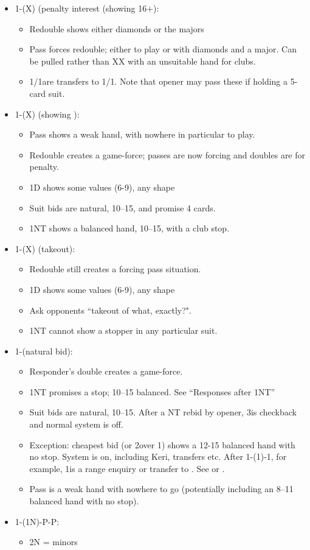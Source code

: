 \documentclass[a4paper,14pt]{extarticle}
\begin{document}
\begin{itemize}
\item 1\clubs-(X) (penalty interest (showing 16+):
	\begin{itemize}
   \item Redouble shows either diamonds or the majors
   \item Pass forces redouble; either to play or with diamonds and a major. Can be pulled rather than XX with an unsuitable hand for clubs.
   \item 1\diamonds/1\hearts are transfers to 1\hearts/1\spades.  Note that opener may pass these if holding a 5-card 
      suit.
	\end{itemize}
\item 1\clubs-(X) (showing \clubs):
	\begin{itemize}
   \item Pass shows a weak hand, with nowhere in particular to play.
   \item Redouble creates a game-force; passes are now forcing and doubles are for penalty.
	\item 1D shows some values (6-9), any shape
   \item Suit bids are natural, 10--15, and promise 4 cards.
   \item 1NT shows a balanced hand, 10--15, with a club stop.
	\end{itemize}
\item 1\clubs-(X) (takeout):
	\begin{itemize}
   \item Redouble still creates a forcing pass situation.
	\item 1D shows some values (6-9), any shape
   \item Ask opponents ``takeout of what, exactly?".
   \item 1NT cannot show a stopper in any particular suit.
	\end{itemize}
\item 1\clubs-(natural bid):
	\begin{itemize}
   \item Responder's double creates a game-force.
   \item 1NT promises a stop; 10--15 balanced. See ``Responses after 1NT'' 
   \item Suit bids are natural, 10--15. After a NT rebid by opener, 3\clubs is checkback and normal system is off. 
   \item Exception: cheapest bid (or 2\spades over 1\spades) shows a 12-15 balanced hand with no stop.  System is on, including Keri, transfers etc.  After 1\clubs-(1\diamonds)-1\hearts, for example, 1\spades is a range enquiry or transfer to \clubs. See  or .
   \item Pass is a weak hand with nowhere to go (potentially including an 8--11 balanced hand with no stop).
	\end{itemize}
\item 1\clubs-(1N)-P-P:
	\begin{itemize}
	\item 2N = minors
	\end{itemize}
\end{itemize}
\end{document}

